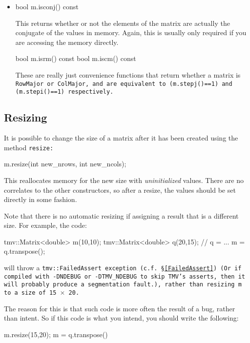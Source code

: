 \begin{itemize}
\item
\begin{tmvcode}
bool m.isconj() const
\end{tmvcode}
This returns whether or not the elements of the matrix are actually the conjugate of the values in memory.  Again, this is usually only required if you are accessing the memory directly.

\begin{tmvcode}
bool m.isrm() const
bool m.iscm() const
\end{tmvcode}
These are really just convenience functions that return whether a matrix is \tt{RowMajor} or \tt{ColMajor}, and are equivalent to \tt{(m.stepj()==1)} and \tt{(m.stepi()==1)} respectively.

\end{itemize}

\subsection{Resizing}
\label{Matrix_Resize}

It is possible to change the size of a matrix after it has been created using the method \tt{resize}:
\begin{tmvcode}
m.resize(int new_nrows, int new_ncols);
\end{tmvcode}
This reallocates memory for the new size with {\em uninitialized} values.
There are no correlates to the other constructors, so after a resize, the 
values should be set directly in some fashion.

Note that there is no automatic resizing if assigning a result that is a different size. 
For example, the code:
\begin{tmvcode}
tmv::Matrix<double> m(10,10);
tmv::Matrix<double> q(20,15);
// q = ...
m = q.transpose();
\end{tmvcode}
will throw a \tt{tmv::FailedAssert} exception (c.f. \S\ref{FailedAssert}) (Or if compiled with 
\tt{-DNDEBUG} or \tt{-DTMV\_NDEBUG} to skip TMV's asserts, then it will probably produce a segmentation fault.),
rather than resizing \tt{m} to a size of 15 $\times$ 20.  

The reason for this is that such code is more often the result of a bug, rather than intent.
So if this code is what you intend, you should write the following:
\begin{tmvcode}
m.resize(15,20);
m = q.transpose()
\end{tmvcode}

